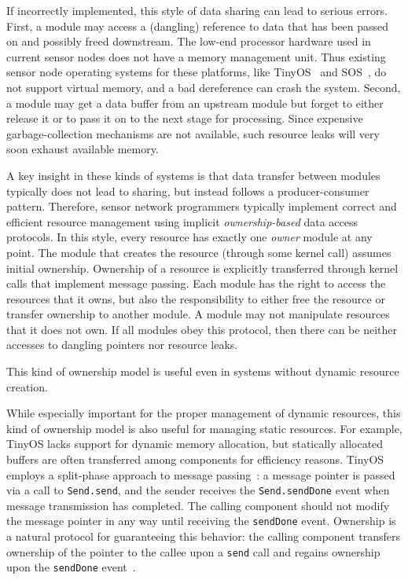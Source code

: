If incorrectly implemented, this style of data sharing can lead to
serious errors.  First, a module may access a (dangling) reference to
data that has been passed on and possibly freed downstream. 
%
The low-end processor hardware used in current sensor nodes does not
have a memory management unit.  Thus existing sensor node operating
systems for these platforms, like TinyOS~\cite{TinyOS} and
SOS~\cite{sos}, do not support virtual memory, and a bad dereference
can crash the system. 
%
Second, a module may get a data buffer from an upstream module but
forget to either release it or to pass it on to the next stage for
processing.  Since expensive garbage-collection mechanisms are not
available, such resource leaks will very soon exhaust available
memory.


A key insight in these kinds of systems is that data transfer between
modules typically does not lead to sharing, but instead follows a
producer-consumer pattern.  Therefore, sensor network programmers
typically implement correct and efficient resource management using
implicit {\em ownership-based} data access protocols.  In this style,
every resource has exactly one {\em owner} module at any point.  The
module that creates the resource (through some kernel call) assumes
initial ownership.  Ownership of a resource is explicitly transferred
through kernel calls that implement message passing.  Each module has
the right to access the resources that it owns, but also the
responsibility to either free the resource or transfer ownership to
another module.  A module may not manipulate resources that it does
not own.  If all modules obey this protocol, then there can be neither
accesses to dangling pointers nor resource leaks.

This kind of ownership model is useful even in systems without dynamic
resource creation.


While especially important for the proper management of dynamic
resources, this kind of ownership model is also useful for managing
static resources.  For example, TinyOS lacks support for dynamic
memory allocation, but statically allocated buffers are often
transferred among components for efficiency reasons.  TinyOS employs a
split-phase approach to message passing~\cite{TinyOS}: a message
pointer is passed via a call to {\tt Send.send}, and the sender
receives the {\tt Send.sendDone} event when message transmission has
completed.  The calling component should not modify the message
pointer in any way until receiving the {\tt sendDone} event.
Ownership is a natural protocol for guaranteeing this behavior:  the
calling component transfers ownership of the pointer to the callee
upon a {\tt send} call and regains ownership upon the {\tt sendDone}
event~\cite{ownershipthread}.


